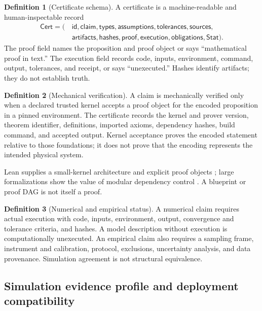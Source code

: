 \documentclass[11pt,a4paper]{article}
\theoremstyle{definition}
\newtheorem{definition}{Definition}[section]
\theoremstyle{plain}
\theoremstyle{remark}
\newcommand{\Cert}{\mathsf{Cert}}
\newcommand{\Stat}{\mathsf{Stat}}
\begin{document}
\begin{definition}[Certificate schema]\label{def:certschema}
A certificate is a machine-readable and human-inspectable record
\[
\begin{aligned}
\Cert=(\,&\mathsf{id},\mathsf{claim},\mathsf{types},\mathsf{assumptions},
\mathsf{tolerances},\mathsf{sources},\\
&\mathsf{artifacts},\mathsf{hashes},\mathsf{proof},\mathsf{execution},
\mathsf{obligations},\Stat).
\end{aligned}
\]
The proof field names the proposition and proof object or says
``mathematical proof in text.''  The execution field records code, inputs,
environment, command, output, tolerances, and receipt, or says
``unexecuted.''  Hashes identify artifacts; they do not establish truth.
\end{definition}

\begin{definition}[Mechanical verification]\label{def:mechanical}
A claim is mechanically verified only when a declared trusted kernel accepts
a proof object for the encoded proposition in a pinned environment.  The
certificate records the kernel and prover version, theorem identifier,
definitions, imported axioms, dependency hashes, build command, and accepted
output.  Kernel acceptance proves the encoded statement relative to those
foundations; it does not prove that the encoding represents the intended
physical system.
\end{definition}

Lean supplies a small-kernel architecture and explicit proof objects
\citep{demouraullrich2021}; large formalizations show the value of modular
dependency control \citep{hales2017,commelintopaz2024}.  A blueprint or proof
DAG is not itself a proof.

\begin{definition}[Numerical and empirical status]\label{def:numemp}
A numerical claim requires actual execution with code, inputs, environment,
output, convergence and tolerance criteria, and hashes.  A model description
without execution is computationally unexecuted.  An empirical claim also
requires a sampling frame, instrument and calibration, protocol, exclusions,
uncertainty analysis, and data provenance.  Simulation agreement is not
structural equivalence.
\end{definition}

\subsection{Simulation evidence profile and deployment compatibility}
\label{sec:simulation-profile}
\end{document}

